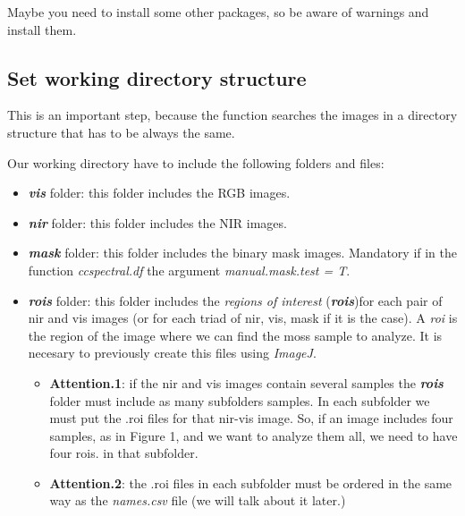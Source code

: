 \documentclass[
]{article}
\providecommand{\tightlist}{%
  \setlength{\itemsep}{0pt}\setlength{\parskip}{0pt}}
\begin{document}
Maybe you need to install some other packages, so be aware of warnings
and install them.

\hypertarget{set-working-directory-structure}{%
\subsection{Set working directory
structure}\label{set-working-directory-structure}}

This is an important step, because the function searches the images in a
directory structure that has to be always the same.

Our working directory have to include the following folders and files:

\begin{itemize}
\tightlist
\item
  \emph{\textbf{vis}} folder: this folder includes the RGB images.
\item
  \emph{\textbf{nir}} folder: this folder includes the NIR images.
\item
  \emph{\textbf{mask}} folder: this folder includes the binary mask
  images. Mandatory if in the function \emph{ccspectral.df} the argument
  \emph{manual.mask.test = T}.
\end{itemize}

\begin{itemize}
\item
  \emph{\textbf{rois}} folder: this folder includes the \emph{regions of
  interest} (\emph{\textbf{rois}})for each pair of nir and vis images
  (or for each triad of nir, vis, mask if it is the case). A \emph{roi}
  is the region of the image where we can find the moss sample to
  analyze. It is necesary to previously create this files using
  \emph{ImageJ}.

  \begin{itemize}
  \tightlist
  \item
    \textbf{Attention.1}: if the nir and vis images contain several
    samples the \emph{\textbf{rois}} folder must include as many
    subfolders samples. In each subfolder we must put the .roi files for
    that nir-vis image. So, if an image includes four samples, as in
    Figure 1, and we want to analyze them all, we need to have four
    rois. in that subfolder.
  \item
    \textbf{Attention.2}: the .roi files in each subfolder must be
    ordered in the same way as the \emph{names.csv} file (we will talk
    about it later.)
  \end{itemize}
\end{itemize}
\end{document}
